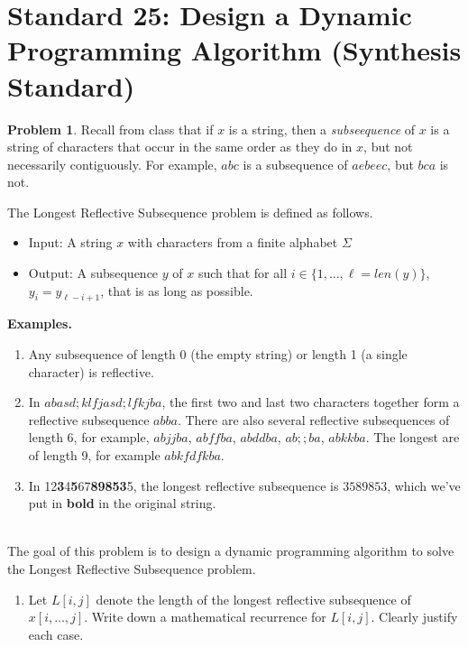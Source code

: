 \documentclass[11pt]{article}
\theoremstyle{definition}
\theoremstyle{definition}
\newtheorem{required}{Problem}
\theoremstyle{definition}
\begin{document}
\newpage
\section{Standard 25: Design a Dynamic Programming Algorithm (Synthesis Standard)}

\begin{required}
Recall from class that if $x$ is a string, then a \emph{subseequence} of $x$ is a string of characters that occur in the same order as they do in $x$, but not necessarily contiguously. For example, $abc$ is a subsequence of $aebeec$, but $bca$ is not.

The \textsf{Longest Reflective Subsequence} problem is defined as follows.
\begin{itemize}
\item \textsf{Input:} A string $x$ with characters from a finite alphabet $\Sigma$
\item \textsf{Output:} A subsequence $y$ of $x$ such that for all $i \in \{1, \ldots, \ell=len(y)\}$, $y_{i} = y_{\ell - i + 1}$, that is as long as possible.
\end{itemize}

\textbf{Examples.} 
\begin{enumerate}
\item Any subsequence of length 0 (the empty string) or length 1 (a single character) is reflective.

\item In $abasd;klfjasd;lfkjba$, the first two and last two characters together form a reflective subsequence $abba$. There are also several reflective subsequences of length 6, for example, $abjjba$, $abffba$, $abddba$, $ab;;ba$, $abkkba$. The longest are of length 9, for example $abkfdfkba$.

\item In 12\textbf{3}4\textbf{5}67\textbf{89853}5, the longest reflective subsequence is $3589853$, which we've put in \textbf{bold} in the original string.
\end{enumerate}


\noindent \\ The goal of this problem is to design a dynamic programming algorithm to solve the \textsf{Longest Reflective Subsequence} problem.

\begin{enumerate}[label=(\alph*)]
\subsection{Problem 25\ref{2a}}
\item \label{2a} Let $L[i, j]$ denote the length of the longest reflective subsequence of $x[i, \ldots, j]$. Write down a mathematical recurrence for $L[i, j]$. Clearly justify each case.


\end{enumerate}
\end{required}
\end{document}
